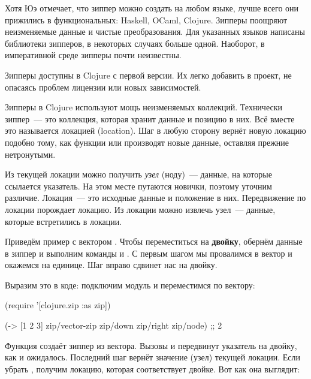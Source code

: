 
Хотя Юэ отмечает, что зиппер можно создать на любом языке, лучше всего они
прижились в функциональных: Haskell, OCaml, Clojure. Зипперы поощряют
неизменяемые данные и чистые преобразования. Для указанных языков написаны
библиотеки зипперов, в некоторых случаях больше одной. Наоборот, в императивной
среде зипперы почти неизвестны.

Зипперы доступны в Clojure с первой версии. Их легко добавить в проект, не
опасаясь проблем лицензии или новых зависимостей.

Зипперы в Clojure используют мощь неизменяемых коллекций. Технически зиппер~---
это коллекция, которая хранит данные и позицию в них. Всё вместе это называется
локацией (location). Шаг в любую сторону вернёт новую локацию подобно тому, как
функции  или  производят новые данные, оставляя прежние
нетронутыми.


Из текущей локации можно получить \emph{узел} (ноду)~--- данные, на которые ссылается
указатель. На этом месте путаются новички, поэтому уточним различие. Локация~---
это исходные данные и положение в них. Передвижение по локации порождает
локацию. Из локации можно извлечь узел~--- данные, которые встретились в локации.


Приведём пример с вектором \code{[1 2 3]}. Чтобы переместиться на
\textbf{двойку}, обернём данные в зиппер и выполним команды  и
. С первым шагом мы провалимся в вектор и окажемся на
единице. Шаг вправо сдвинет нас на двойку.

Выразим это в коде: подключим модуль  и переместимся по
вектору:

\begin{english}
  \begin{clojure}
(require '[clojure.zip :as zip])

(-> [1 2 3]
    zip/vector-zip
    zip/down
    zip/right
    zip/node)
;; 2
  \end{clojure}
\end{english}

Функция  создаёт зиппер из вектора. Вызовы  и
 передвинут указатель на двойку, как и ожидалось. Последний шаг
 вернёт значение (узел) текущей локации. Если убрать ,
получим локацию, которая соответствует двойке. Вот как она выглядит:

